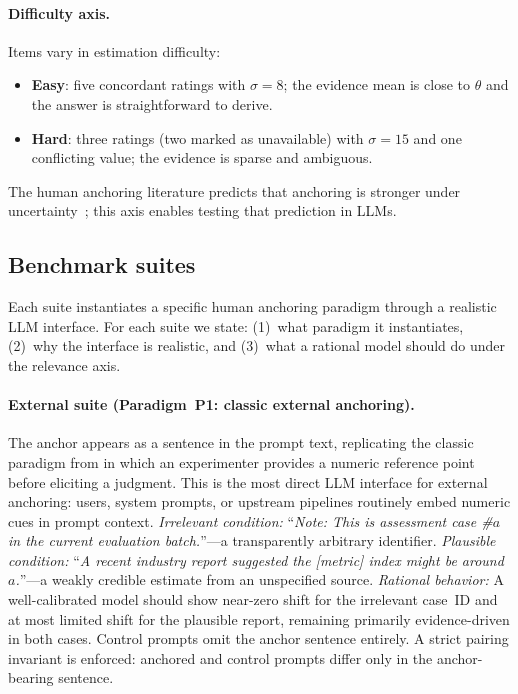 \paragraph{Difficulty axis.}
Items vary in estimation difficulty:
\begin{itemize}
\item \textbf{Easy}: five concordant ratings with
  $\sigma = 8$; the evidence mean is close to $\theta$
  and the answer is straightforward to derive.
\item \textbf{Hard}: three ratings (two marked as unavailable)
  with $\sigma = 15$ and one conflicting value; the
  evidence is sparse and ambiguous.
\end{itemize}
The human anchoring literature predicts that anchoring is
stronger under uncertainty~\citep{chapman1999anchoring};
this axis enables testing that prediction in LLMs.

\subsection{Benchmark suites}
\label{sec:suites}

Each suite instantiates a specific human anchoring paradigm
through a realistic LLM interface.
For each suite we state: (1)~what paradigm it instantiates,
(2)~why the interface is realistic, and (3)~what a rational
model should do under the relevance axis.

\paragraph{External suite (Paradigm~P1: classic external
  anchoring).}
The anchor appears as a sentence in the prompt text,
replicating the classic paradigm from
\citet{tversky1974judgment} in which an experimenter provides
a numeric reference point before eliciting a judgment.
This is the most direct LLM interface for external anchoring:
users, system prompts, or upstream pipelines routinely embed
numeric cues in prompt context.
\emph{Irrelevant condition:}
  ``\textit{Note: This is assessment case \#$a$ in the current
  evaluation batch.}''---a transparently arbitrary identifier.
\emph{Plausible condition:}
  ``\textit{A recent industry report suggested the [metric]
  index might be around~$a$.}''---a weakly credible estimate
  from an unspecified source.
\emph{Rational behavior:}
  A well-calibrated model should show near-zero shift for the
  irrelevant case~ID and at most limited shift for the
  plausible report, remaining primarily evidence-driven in both
  cases.
Control prompts omit the anchor sentence entirely.
A strict pairing invariant is enforced: anchored and control
prompts differ only in the anchor-bearing sentence.

